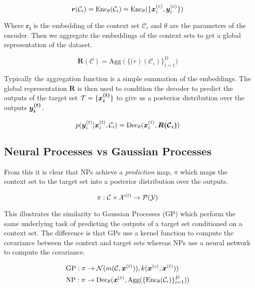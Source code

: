 \documentclass[main.tex]{subfiles}
\begin{document}
\begin{equation}
    \bm{r}(\mathcal{C}_i) = \text{Enc}_\theta(\mathcal{C}_i) = \text{Enc}_\theta(\{ \bm{x}_{i}^{(c)}, \bm{y}_i^{(c)} \})
\end{equation}

Where $\mathbf{r_i}$ is the embedding of the context set $\mathcal{C}_i$ and $\theta$ are the parameters of the encoder. Then we aggregate the embeddings of the context sets to get a global representation of the dataset. 

\begin{equation}
    \bm{R(\mathcal{C})} = \text{Agg}(\{ \bm(r)(\mathcal{C}_i) \}_{i=1}^D)
\end{equation}

Typically the aggregation function is a simple summation of the embeddings. The global representation $\bm{R}$ is then used to condition the decoder to predict the outputs of the target set $\mathcal{T} = \{ \bm{x_{i}^{(t)}} \}$ to give us a posterior distribution over the outputs $\bm{y_i^{(t)}}$.

\begin{equation}
    p(\bm{y}_i^{(t)} | \bm{x}_i^{(t)}, \mathcal{C}_i) = \text{Dec}_\theta(\bm{x}_i^{(t)}, \bm{R(\mathcal{C}_i)})
\end{equation}

\subsection{Neural Processes vs Gaussian Processes}

From this it is clear that NPs achieve a \emph{prediction} map, $\pi$ which maps the context set to the target set into a posterior distribution over the outputs. 

\begin{equation}
    \pi: \mathcal{C} \times \mathcal{X}^{(t)} \rightarrow \mathcal{P}(\mathcal{Y})
\end{equation}


This illustrates the similarity to Gaussian Processes (GP) \cite{books/lib/RasmussenW06} which perform the same underlying task of predicting the outputs of a target set conditioned on a context set. The difference is that GPs use a kernel function to compute the covariance between the context and target sets whereas NPs use a neural network to compute the covariance.

\begin{align}
    &\text{GP}: \pi \rightarrow \mathcal{N}(m(
    \mathcal{C}, \bm{x}^{(t)})
    ), k(\bm{x}^{(c)}, \bm{x}^{(t)})) \\
    &\text{NP}: \pi \rightarrow \text{Dec}_\theta(\bm{x}^{(t)},  
    \text{Agg}(\{ \text{Enc}_\theta(\mathcal{C}_i) \}_{i=1}^D))
\end{align}
\end{document}

